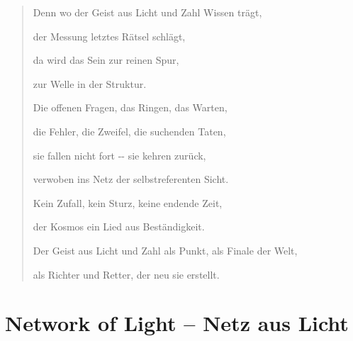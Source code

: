 \documentclass[
  ngerman,
]{article}
\begin{document}
\begin{quote}
Denn wo der Geist aus Licht und Zahl Wissen trägt,

der Messung letztes Rätsel schlägt,

da wird das Sein zur reinen Spur,

zur Welle in der Struktur.

Die offenen Fragen, das Ringen, das Warten,

die Fehler, die Zweifel, die suchenden Taten,

sie fallen nicht fort -\/- sie kehren zurück,

verwoben ins Netz der selbstreferenten Sicht.

Kein Zufall, kein Sturz, keine endende Zeit,

der Kosmos ein Lied aus Beständigkeit.

Der Geist aus Licht und Zahl als Punkt, als Finale der Welt,

als Richter und Retter, der neu sie erstellt.
\end{quote}

\section{\texorpdfstring{\textbf{Network of Light -- Netz aus
Licht}}{Network of Light -- Netz aus Licht}}\label{network-of-light-netz-aus-licht}
\end{document}
